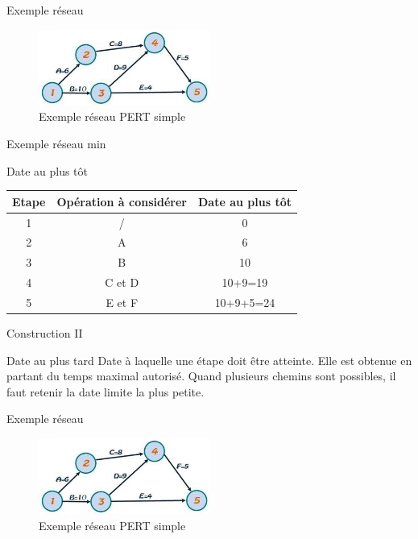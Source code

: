 \documentclass{beamer}
\begin{document}
\begin{frame}{Exemple réseau}
\begin{figure}
      \centering
      \includegraphics[width=0.5\textwidth]{ex_reseau}
      \caption{ Exemple réseau PERT simple}
\end{figure}
\end{frame}

\begin{frame}{Exemple réseau min}
\begin{block}{Date au plus tôt}
\centering
\begin{tabular}{|c|c|c|}
\hline
    Etape & Opération à considérer & Date au plus tôt \\
    \hline
    1 & / & 0 \\
    \hline
    2 & A & 6 \\
    \hline
    3 & B & 10 \\
    \hline
    4 & C et D & 10+9=19 \\
    \hline
    5 & E et F & 10+9+5=24 \\
    \hline
\end{tabular}
\end{block}
\end{frame}

\begin{frame}{Construction II}
\begin{block}{Date au plus tard}
Date à laquelle une étape doit être atteinte. Elle est obtenue en partant du temps maximal autorisé. Quand plusieurs chemins sont possibles, il faut retenir la date limite la plus petite.
\end{block}
\end{frame}

\begin{frame}{Exemple réseau}
\begin{figure}
      \centering
      \includegraphics[width=0.5\textwidth]{ex_reseau}
      \caption{ Exemple réseau PERT simple}
\end{figure}
\end{frame}
\end{document}
